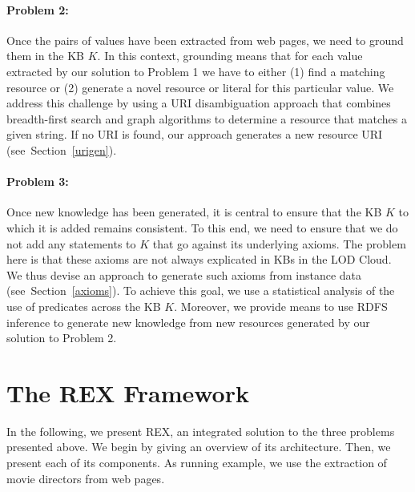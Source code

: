 \paragraph{Problem 2:}
Once the  pairs of values have been extracted from web pages, we need to ground them in the  \ac{KB} $K$. 
In this context, grounding means that for each value extracted by our solution to Problem 1 we have to either (1) find a matching resource or (2) generate a novel resource or literal for this particular value. 
We address this challenge by using a URI disambiguation approach that combines breadth-first search and graph algorithms to determine a resource that matches a given string. 
If no URI is found, our approach generates a new resource URI (see~Section~\ref{urigen}). 

\paragraph{Problem 3:}
Once new knowledge has been generated, it is central to ensure that the  \ac{KB} $K$ to which it is added remains consistent. 
To this end, we need to ensure that we do not add any statements to $K$ that go against its underlying axioms. 
The problem here is that these axioms are not always explicated in  \ac{KB}s in the \ac{LOD} Cloud. 
We thus devise an approach to generate such axioms from instance data (see~Section~\ref{axioms}). 
To achieve this goal, we use a statistical analysis of the use of predicates across the  \ac{KB} $K$. 
Moreover, we provide means to use RDFS inference to generate new knowledge from new resources generated by our solution to Problem 2.


\section{The REX Framework}
\label{sec:rex}
In the following, we present REX, an integrated  solution to the three problems presented above.
We begin by giving an overview of its architecture.
Then, we present each of its components.
As running example, we use the extraction of movie directors from web pages.

